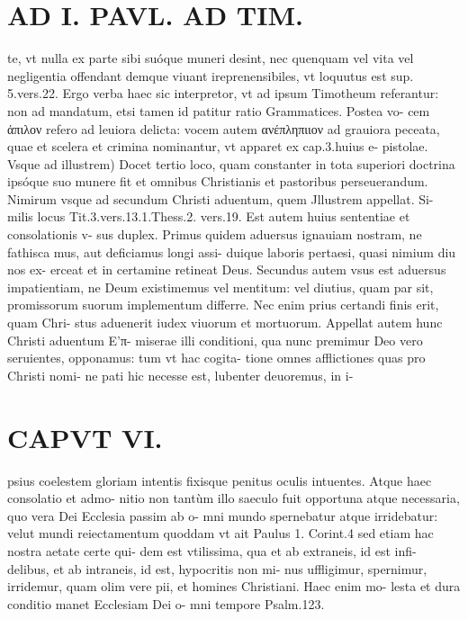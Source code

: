\documentclass{article}
\begin{document}
\begin{pages}
\section*{AD I. PAVL. AD TIM. }
\marginpar{[ p.310 ]}\pstart te, vt nulla ex parte sibi suóque muneri desint, nec quenquam vel vita vel negligentia offendant demque viuant ireprenensibiles, vt loquutus est sup. 5.vers.22.  \pend\pstart Ergo verba haec sic interpretor, vt ad ipsum Timotheum referantur: non ad mandatum, etsi tamen id patitur ratio Grammatices. Postea vo- cem ἀπιλον refero ad leuiora delicta: vocem autem ανέπληπιιον ad grauiora peceata, quae et scelera et crimina nominantur, vt apparet ex cap.3.huius e- pistolae.  \pend\pstart Vsque ad illustrem) Docet tertio loco, quam constanter in tota superiori doctrina ipsóque  suo munere fit et omnibus Christianis et pastoribus perseuerandum. Nimirum vsque ad secundum Christi aduentum, quem Jllustrem appellat. Si- milis locus Tit.3.vers.13.1.Thess.2. vers.19.  \pend\pstart Est autem huius sententiae et consolationis v- sus duplex. Primus quidem aduersus ignauiam nostram, ne fathisca mus, aut deficiamus longi assi- duique laboris pertaesi, quasi nimium diu nos ex- erceat et in certamine retineat Deus. Secundus autem vsus est aduersus impatientiam, ne Deum existimemus vel mentitum: vel diutius, quam par sit, promissorum suorum implementum differre. Nec enim prius certandi finis erit, quam Chri- stus aduenerit iudex viuorum et mortuorum.  \pend\pstart Appellat autem hunc Christi aduentum E’π- miserae illi conditioni, qua nunc premimur Deo vero seruientes, opponamus: tum vt hac cogita- tione omnes afflictiones quas pro Christi nomi- ne pati hic necesse est, lubenter deuoremus, in i-  \pend
\section*{CAPVT  VI. }
\marginpar{[ p.17 ]}\pstart psius coelestem gloriam intentis fixisque penitus oculis intuentes. Atque haec consolatio et admo- nitio non tantùm illo saeculo fuit opportuna atque  necessaria, quo vera Dei Ecclesia passim ab o- mni mundo spernebatur atque irridebatur: velut mundi reiectamentum quoddam vt ait Paulus 1. Corint.4 sed etiam hac nostra aetate certe qui- dem est vtilissima, qua et ab extraneis, id est infi- delibus, et ab intraneis, id est, hypocritis non mi- nus uffligimur, spernimur, irridemur, quam olim vere pii, et homines Christiani. Haec enim mo- lesta et dura conditio manet Ecclesiam Dei o- mni tempore Psalm.123.  \pend
{}
{}

\end{pages}
\end{document}
